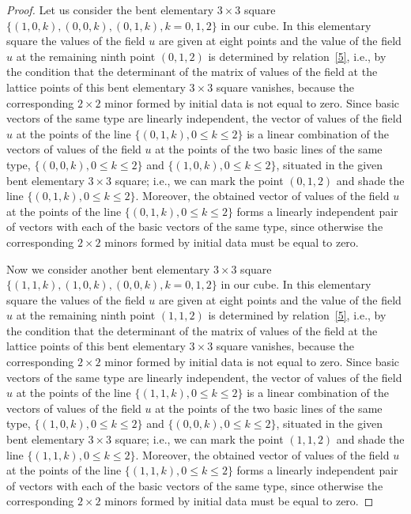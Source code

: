 \begin{proof}
Let us consider the bent elementary $3 \times 3$ square $\{(1, 0,
k), (0, 0, k), (0, 1, k), k = 0, 1, 2\}$ in our cube. In this
elementary square the values of the f\/ield $u$ are given at eight
points and the value of the f\/ield $u$ at the remaining ninth point
$(0, 1, 2)$ is determined by relation~\eqref{5}, i.e., by the
condition that the determinant of the matrix of values of the f\/ield
at the lattice points of this bent elementary $3 \times 3$ square
vanishes, because the corresponding $2 \times 2$ minor formed by
initial data is not equal to zero. Since basic vectors of the same
type are linearly independent, the vector of values of the f\/ield $u$
at the points of the line $\{(0, 1, k), 0 \leq k \leq 2\}$ is a
linear combination of the vectors of values of the f\/ield $u$ at the
points of the two basic lines of the same type, $\{(0, 0, k), 0 \leq
k \leq 2\}$ and $\{(1, 0, k), 0 \leq k \leq 2\}$, situated in the
given bent elementary $3 \times 3$ square; i.e., we can mark the
point $(0, 1, 2)$ and shade the line $\{(0, 1, k), 0 \leq k \leq
2\}$. Moreover, the obtained vector of values of the f\/ield $u$ at
the points of the line $\{(0, 1, k), 0 \leq k \leq 2\}$ forms a
linearly independent pair of vectors with each of the basic vectors
of the same type, since otherwise the corresponding $2 \times 2$
minors formed by initial data must be equal to zero.




Now we consider another bent elementary $3 \times 3$ square $\{(1,
1, k), (1, 0, k), (0, 0, k), k = 0, 1, 2\}$ in our cube. In this
elementary square the values of the f\/ield $u$ are given at eight
points and the value of the f\/ield $u$ at the remaining ninth point
$(1, 1, 2)$ is determined by relation~\eqref{5}, i.e., by the
condition that the determinant of the matrix of values of the f\/ield
at the lattice points of this bent elementary $3 \times 3$ square
vanishes, because the corresponding $2 \times 2$ minor formed by
initial data is not equal to zero. Since basic vectors of the same
type are linearly independent, the vector of values of the f\/ield $u$
at the points of the line $\{(1, 1, k), 0 \leq k \leq 2\}$ is a
linear combination of the vectors of values of the f\/ield $u$ at the
points of the two basic lines of the same type, $\{(1, 0, k), 0 \leq
k \leq 2\}$ and $\{(0, 0, k), 0 \leq k \leq 2\}$, situated in the
given bent elementary $3 \times 3$ square; i.e., we can mark the
point $(1, 1, 2)$ and shade the line $\{(1, 1, k), 0 \leq k \leq
2\}$. Moreover, the obtained vector of values of the f\/ield $u$ at
the points of the line $\{(1, 1, k), 0 \leq k \leq 2\}$ forms a
linearly independent pair of vectors with each of the basic vectors
of the same type, since otherwise the corresponding $2 \times 2$
minors formed by initial data must be equal to zero.





\end{proof}
